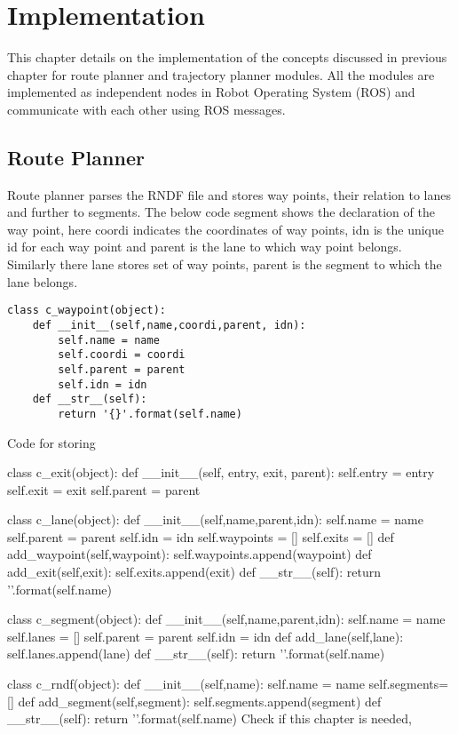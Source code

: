 \chapter{Implementation}
\label{implementation}
This chapter details on the implementation of the concepts discussed in previous chapter for route planner and trajectory planner modules. All the modules are implemented as independent nodes in Robot Operating System (ROS) and communicate with each other using ROS messages.

\section{Route Planner}
Route planner parses the RNDF file and stores way points, their relation to lanes and further to segments. The below code segment shows the declaration of the way point, here coordi indicates the coordinates of way points, idn is the unique id for each way point and parent is the lane to which way point belongs. Similarly there lane stores set of way points, parent is the segment to which the lane belongs. 

\begin{lstlisting}
class c_waypoint(object):
	def __init__(self,name,coordi,parent, idn):
		self.name = name
		self.coordi = coordi
		self.parent = parent
		self.idn = idn
	def __str__(self):
		return '{}'.format(self.name)

\end{lstlisting}


\iffalse

Code for storing 

class c_exit(object):
def __init__(self, entry, exit, parent):
self.entry = entry
self.exit = exit
self.parent = parent

class c_lane(object):
def __init__(self,name,parent,idn):
self.name = name
self.parent = parent
self.idn = idn
self.waypoints = []
self.exits = []
def add_waypoint(self,waypoint):
self.waypoints.append(waypoint)
def add_exit(self,exit):
self.exits.append(exit)
def __str__(self):
return '{}'.format(self.name)

class c_segment(object):
def __init__(self,name,parent,idn):
self.name = name
self.lanes = []
self.parent = parent
self.idn = idn
def add_lane(self,lane):
self.lanes.append(lane)
def __str__(self):
return '{}'.format(self.name)

class c_rndf(object):
def __init__(self,name):
self.name = name
self.segments= []
def add_segment(self,segment):
self.segments.append(segment)
def __str__(self):
return '{}'.format(self.name)
Check if this chapter is needed, 

